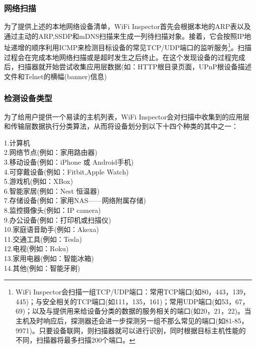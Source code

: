 \documentclass[UTF8]{ctexart}
\begin{document}
	\subsubsection*{网络扫描}
	为了提供上述的本地网络设备清单，WiFi Inspector首先会根据本地的ARP表以及通过主动的ARP,SSDP和mDNS扫描来生成一列待扫描对象。接着，它会按照IP地址递增的顺序利用ICMP来检测目标设备的常见TCP/UDP端口的监听服务\footnote{WiFi Inspector会扫描一组TCP/UDP端口：常用TCP端口(如80，443，139，445)；与安全相关的TCP端口(如111，135，161)；常用UDP端口(如53，67，69)；以及与提供用来给设备分类的数据的服务相关的端口(如20，21，22)。当主机及时响应后，探测器还会进一步探测另一组不那么常见的端口(如81-85，9971)。只要设备联网，则扫描器就可以进行识别，同时根据目标主机性能的不同，扫描器将最多扫描200个端口。}。扫描过程会在完成本地网络扫描或是超时发生之后终止。在这个发现设备的过程完成后，扫描器就开始尝试收集应用层数据(如：HTTP根目录页面，UPnP根设备描述文件和Telnet的横幅(banner)信息)
	
	\subsubsection*{检测设备类型}
	为了给用户提供一个易读的主机列表，WiFi Inspector会对扫描中收集到的应用层和传输层数据执行分类算法，从而将设备划分到以下十四个种类的其中之一：
	
	\noindent
	1.计算机\\
	2.网络节点(例如：家用路由器)\\
	3.移动设备(例如：iPhone 或 Android手机)\\
	4.可穿戴设备(例如：Fitbit,Apple Watch)\\
	5.游戏机(例如：XBox)\\
	6.智能家居(例如：Nest 恒温器)\\
	7.存储设备(例如：家用NAS——网络附属存储)\\
	8.监控摄像头(例如：IP camera)\\
	9.办公设备(例如：打印机或扫描仪)\\
	10.家庭语音助手(例如：Akexa)\\
	11.交通工具(例如：Tesla)\\
	12.电视(例如：Roku)\\
	13.家用电器(例如：智能冰箱)\\
	14.其他(例如：智能牙刷)
	
\end{document}
